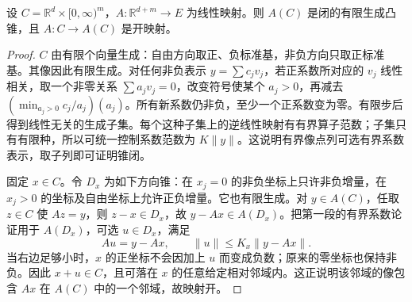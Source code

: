 \begin{lemma}\label{g4:lem:1202:linear-cone-openness}
	设 \(C=\mathbb R^d\times[0,\infty)^m\)，\(A:\mathbb R^{d+m}\to E\) 为线性映射。则 \(A(C)\) 是闭的有限生成凸锥，且 \(A:C\to A(C)\) 是开映射。
\end{lemma}
\begin{proof}
	\(C\) 由有限个向量生成：自由方向取正、负标准基，非负方向只取正标准基。其像因此有限生成。对任何非负表示 \(y=\sum c_jv_j\)，若正系数所对应的 \(v_j\) 线性相关，取一个非零关系 \(\sum a_jv_j=0\)，改变符号使某个 \(a_j>0\)，再减去 \((\min_{a_j>0}c_j/a_j)(a_j)\)。所有新系数仍非负，至少一个正系数变为零。有限步后得到线性无关的生成子集。每个这种子集上的逆线性映射有有界算子范数；子集只有有限种，所以可统一控制系数范数为 \(K\|y\|\)。这说明有界像点列可选有界系数表示，取子列即可证明锥闭。

	固定 \(x\in C\)。令 \(D_x\) 为如下方向锥：在 \(x_j=0\) 的非负坐标上只许非负增量，在 \(x_j>0\) 的坐标及自由坐标上允许正负增量。它也有限生成。对 \(y\in A(C)\)，任取 \(z\in C\) 使 \(Az=y\)，则 \(z-x\in D_x\)，故 \(y-Ax\in A(D_x)\)。把第一段的有界系数论证用于 \(A(D_x)\)，可选 \(u\in D_x\)，满足
	\[
		Au=y-Ax,\qquad \|u\|\leq K_x\|y-Ax\|.
	\]
	当右边足够小时，\(x\) 的正坐标不会因加上 \(u\) 而变成负数；原来的零坐标也保持非负。因此 \(x+u\in C\)，且可落在 \(x\) 的任意给定相对邻域内。这正说明该邻域的像包含 \(Ax\) 在 \(A(C)\) 中的一个邻域，故映射开。
\end{proof}

